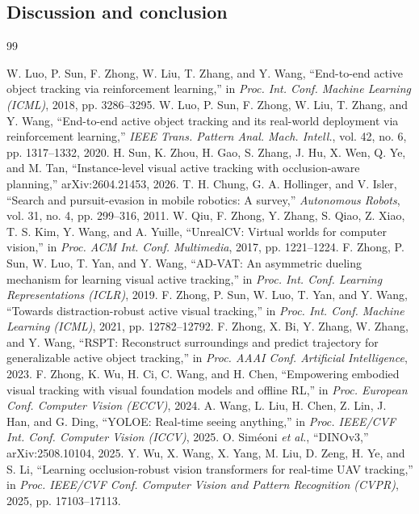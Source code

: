 \documentclass[12pt,a4paper]{article}
\begin{document}
\subsection{Discussion and conclusion}
\clearpage
\begin{thebibliography}{99}
 W. Luo, P. Sun, F. Zhong, W. Liu, T. Zhang, and Y. Wang, ``End-to-end active object tracking via reinforcement learning,'' in \emph{Proc. Int. Conf. Machine Learning (ICML)}, 2018, pp. 3286–3295.
 W. Luo, P. Sun, F. Zhong, W. Liu, T. Zhang, and Y. Wang, ``End-to-end active object tracking and its real-world deployment via reinforcement learning,'' \emph{IEEE Trans. Pattern Anal. Mach. Intell.}, vol. 42, no. 6, pp. 1317–1332, 2020.
 H. Sun, K. Zhou, H. Gao, S. Zhang, J. Hu, X. Wen, Q. Ye, and M. Tan, ``Instance-level visual active tracking with occlusion-aware planning,'' arXiv:2604.21453, 2026.
 T. H. Chung, G. A. Hollinger, and V. Isler, ``Search and pursuit-evasion in mobile robotics: A survey,'' \emph{Autonomous Robots}, vol. 31, no. 4, pp. 299–316, 2011.
 W. Qiu, F. Zhong, Y. Zhang, S. Qiao, Z. Xiao, T. S. Kim, Y. Wang, and A. Yuille, ``UnrealCV: Virtual worlds for computer vision,'' in \emph{Proc. ACM Int. Conf. Multimedia}, 2017, pp. 1221–1224.
 F. Zhong, P. Sun, W. Luo, T. Yan, and Y. Wang, ``AD-VAT: An asymmetric dueling mechanism for learning visual active tracking,'' in \emph{Proc. Int. Conf. Learning Representations (ICLR)}, 2019.
 F. Zhong, P. Sun, W. Luo, T. Yan, and Y. Wang, ``Towards distraction-robust active visual tracking,'' in \emph{Proc. Int. Conf. Machine Learning (ICML)}, 2021, pp. 12782–12792.
 F. Zhong, X. Bi, Y. Zhang, W. Zhang, and Y. Wang, ``RSPT: Reconstruct surroundings and predict trajectory for generalizable active object tracking,'' in \emph{Proc. AAAI Conf. Artificial Intelligence}, 2023.
 F. Zhong, K. Wu, H. Ci, C. Wang, and H. Chen, ``Empowering embodied visual tracking with visual foundation models and offline RL,'' in \emph{Proc. European Conf. Computer Vision (ECCV)}, 2024.
 A. Wang, L. Liu, H. Chen, Z. Lin, J. Han, and G. Ding, ``YOLOE: Real-time seeing anything,'' in \emph{Proc. IEEE/CVF Int. Conf. Computer Vision (ICCV)}, 2025.
 O. Siméoni \emph{et al.}, ``DINOv3,'' arXiv:2508.10104, 2025.
 Y. Wu, X. Wang, X. Yang, M. Liu, D. Zeng, H. Ye, and S. Li, ``Learning occlusion-robust vision transformers for real-time UAV tracking,'' in \emph{Proc. IEEE/CVF Conf. Computer Vision and Pattern Recognition (CVPR)}, 2025, pp. 17103–17113.

\end{thebibliography}
\end{document}
